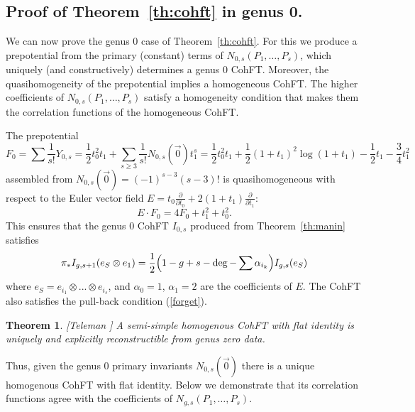 \documentclass[11pt]{article}
\theoremstyle{plain}
\newtheorem{theorem}{Theorem}
\theoremstyle{definition}
\begin{document}
\subsection{Proof of Theorem~\ref{th:cohft} in genus 0.}

We can now prove the genus 0 case of Theorem~\ref{th:cohft}.  For this we produce a 
prepotential from the primary (constant) terms of $N_{0,s}(P_1,\dots,P_s)$, which uniquely (and constructively) determines a genus 0 CohFT.  Moreover, the quasihomogeneity of the prepotential implies a homogeneous CohFT.  The higher coefficients of $N_{0,s}(P_1,\dots,P_s)$ satisfy a homogeneity condition that makes them the correlation functions of the homogeneous CohFT.

The prepotential
\begin{equation}  \label{prep}
F_0=\sum\frac{1}{s!}Y_{0,s}=\frac{1}{2}t_0^2t_1+\sum_{s\geq 3}\frac{1}{s!}N_{0,s}(\vec{0})t_1^s
=\frac{1}{2}t_0^2t_1+\frac{1}{2}(1+t_1)^2\log(1+t_1)-\frac{1}{2}t_1-\frac{3}{4}t_1^2
\end{equation}
assembled from $N_{0,s}(\vec{0})=(-1)^{s-3}(s-3)!$ is quasihomogeneous with respect to the Euler vector field $E=t_0\frac{\partial}{\partial t_0}+2(1+t_1)\frac{\partial}{\partial t_1}$:
$$E\cdot F_0=4F_0+t_1^2+t_0^2.
$$
This ensures that the genus 0 CohFT $I_{0,s}$ produced from Theorem~\ref{th:manin} satisfies
\begin{equation}  \label{pushf}
\pi_*I_{g,s+1}(e_S\otimes e_1)=\frac{1}{2}\Bigl(1-g+s-\deg-\sum\alpha_{i_k}\Bigr)I_{g,s}(e_S)
\end{equation}
where $e_S=e_{i_1}\otimes...\otimes e_{i_s}$, and $\alpha_0=1$, $\alpha_1=2$ are the coefficients of $E$.  
The CohFT also satisfies the pull-back condition (\ref{forget}).


\begin{theorem}{\rm[Teleman \cite{TelStr}]}
A semi-simple homogenous CohFT with flat identity is uniquely and explicitly reconstructible from genus zero data. 
\end{theorem}
Thus, given the genus 0 primary invariants $N_{0,s}(\vec{0})$ there is a unique homogenous CohFT with flat identity.  Below we demonstrate that its correlation functions agree with the coefficients of $N_{g,s}(P_1,\dots,P_s)$.
\end{document}
